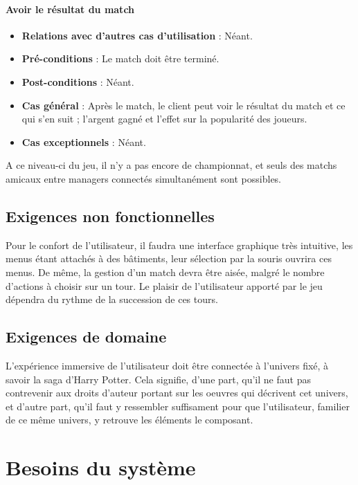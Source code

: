 \documentclass[a4paper,titlepage]{scrreprt}
\begin{document}
    \subsubsection{Avoir le résultat du match}
      \begin{itemize}
        \item \textbf{Relations avec d'autres cas d'utilisation}  : Néant.
        \item \textbf{Pré-conditions} : Le match doit être terminé.
        \item \textbf{Post-conditions} : Néant.
        \item \textbf{Cas général} : Après le match, le client peut voir le résultat du match et ce qui s’en suit ; l’argent gagné et l’effet sur la popularité des joueurs. 
        \item \textbf{Cas exceptionnels} : Néant.
      \end{itemize}

A ce niveau-ci du jeu, il n'y a pas encore de championnat, et seuls des matchs amicaux entre managers connectés simultanément sont possibles.
  
\section{Exigences non fonctionnelles}
  Pour le confort de l'utilisateur, il faudra  une interface graphique très intuitive, 
  les menus étant attachés à des  bâtiments, leur sélection par la souris ouvrira ces menus.
  De même, la gestion d'un match devra être aisée, malgré le nombre d'actions à choisir 
  sur un tour. Le plaisir de l'utilisateur apporté par le jeu dépendra du rythme de la succession de ces tours.
\section{Exigences de domaine}
  L'expérience immersive de l'utilisateur doit être connectée à l'univers fixé, 
  à savoir la saga d'Harry Potter. Cela signifie, d'une part, 
  qu'il ne faut pas contrevenir aux droits d'auteur portant sur les oeuvres 
  qui décrivent cet univers, et d'autre part, qu'il faut y ressembler suffisament pour que 
  l'utilisateur, familier de ce même univers, y retrouve les éléments le composant.
\chapter{Besoins du système}
\end{document}
